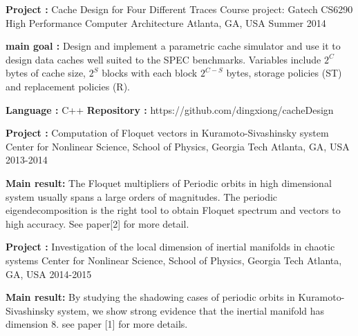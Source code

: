 \begin{cventries}
\cventry
{\textbf{Project :} Cache Design for Four Different Traces} 
{Course project: Gatech CS6290 High Performance Computer Architecture} 
{Atlanta, GA, USA} %
{Summer 2014} %
{
  \begin{cvitems}
  \item {\textbf{main goal :} Design and implement a parametric cache
      simulator and use it to design data caches well suited to the SPEC benchmarks. 
      Variables include $2^C$ bytes of cache size, $2^S$ blocks with each block $2^{C-S}$ bytes,
      storage policies (ST) and replacement policies (R).
    }
  \item {\textbf{Language :} C++  \quad
      \textbf{Repository :} {\color{red} https://github.com/dingxiong/cacheDesign}
    }
  \end{cvitems}
}






\cventry
{\textbf{Project :} Computation of Floquet vectors in Kuramoto-Sivashinsky system} 
{Center for Nonlinear Science, School of Physics, Georgia Tech} 
{Atlanta, GA, USA} %
{2013-2014} %
{
  \begin{cvitems}
    \item {\textbf{Main result:} The Floquet multipliers of Periodic orbits in high dimensional system 
        usually spans a large orders of magnitudes. The periodic eigendecomposition is the right tool
        to obtain Floquet spectrum and vectors to high accuracy. See paper[2] for more detail.
      }
  \end{cvitems}
}

\cventry
{\textbf{Project :} Investigation of the local dimension of inertial manifolds in chaotic systems} 
{Center for Nonlinear Science, School of Physics, Georgia Tech} 
{Atlanta, GA, USA} %
{2014-2015} %
{
  \begin{cvitems}
    \item {\textbf{Main result:} By studying the shadowing cases of periodic orbits in
        Kuramoto-Sivashinsky system, we show strong evidence that the inertial manifold has
        dimension 8. see paper [1] for more details.}
  \end{cvitems}
}


\end{cventries}
